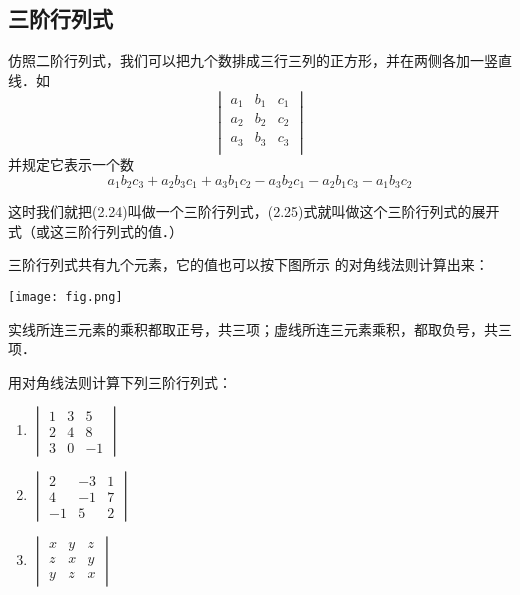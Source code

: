 \subsection{三阶行列式}

仿照二阶行列式，我们可以把九个数排成三行三列的正方形，并在两侧各加一竖直线．如
\begin{equation}
    \begin{vmatrix}
  a_1&b_1&c_1\\a_2&b_2&c_2\\a_3&b_3&c_3\\      
    \end{vmatrix}
\end{equation}
并规定它表示一个数
\begin{equation}
    a_1b_2c_3+a_2b_3c_1+a_3b_1c_2-a_3b_2c_1-a_2b_1c_3-a_1b_3c_2
\end{equation}

这时我们就把(2.24)叫做一个三阶行列式，(2.25)式就叫做这个三阶行列式的展开式（或这三阶行列式的值．）

三阶行列式共有九个元素，它的值也可以按下图所示
的对角线法则计算出来：
\begin{center}
\texttt{[image: fig.png]}
\end{center}


实线所连三元素的乘积都取正号，共三项；虚线所连三元素乘积，都取负号，共三项．

\begin{example}
    用对角线法则计算下列三阶行列式：
\begin{multicols}{3}
\begin{enumerate}
    \item $\begin{vmatrix}
        1&3&5\\2&4&8\\3&0&-1
    \end{vmatrix}$
    \item $\begin{vmatrix}
        2&-3&1\\4&-1&7\\-1&5&2
    \end{vmatrix}$
    \item $\begin{vmatrix}
        x&y&z\\z&x&y\\y&z&x
    \end{vmatrix}$
\end{enumerate} 
\end{multicols}
\end{example}

